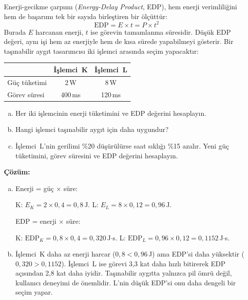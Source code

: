 \begin{ornek}[2.14]
\label{orn:edp}
Enerji-gecikme çarpımı (\emph{Energy-Delay Product}, EDP), hem enerji verimliliğini hem de başarımı tek bir sayıda birleştiren bir ölçüttür:
\[
\text{EDP} = E \times t = P \times t^2
\]
Burada $E$ harcanan enerji, $t$ ise görevin tamamlanma süresidir. Düşük EDP değeri, aynı işi hem az enerjiyle hem de kısa sürede yapabilmeyi gösterir. Bir taşınabilir aygıt tasarımcısı iki işlemci arasında seçim yapacaktır:

\begin{center}
\small
\begin{tabular}{lcc}
\toprule
& \textbf{İşlemci~K} & \textbf{İşlemci~L} \\
\midrule
Güç tüketimi & 2\,W & 8\,W \\
Görev süresi & 400\,ms & 120\,ms \\
\bottomrule
\end{tabular}
\end{center}

\begin{enumerate}[(a)]
    \item Her iki işlemcinin enerji tüketimini ve EDP değerini hesaplayın.
    \item Hangi işlemci taşınabilir aygıt için daha uygundur?
    \item İşlemci~L'nin gerilimi \%20 düşürülürse saat sıklığı \%15 azalır. Yeni güç tüketimini, görev süresini ve EDP değerini hesaplayın.
\end{enumerate}

\textbf{Çözüm:}

\begin{enumerate}[(a)]
    \item Enerji = güç $\times$ süre:

    K: $E_K = 2 \times 0{,}4 = 0{,}8$\,J. \quad L: $E_L = 8 \times 0{,}12 = 0{,}96$\,J.

    EDP = enerji $\times$ süre:

    K: $\text{EDP}_K = 0{,}8 \times 0{,}4 = 0{,}320$\,J$\cdot$s. \quad L: $\text{EDP}_L = 0{,}96 \times 0{,}12 = 0{,}1152$\,J$\cdot$s.

    \item İşlemci~K daha az enerji harcar ($0{,}8 < 0{,}96$\,J) ama EDP'si daha yüksektir ($0{,}320 > 0{,}1152$). İşlemci~L ise görevi 3,3 kat daha hızlı bitirerek EDP açısından 2,8 kat daha iyidir. Taşınabilir aygıtta yalnızca pil ömrü değil, kullanıcı deneyimi de önemlidir. L'nin düşük EDP'si onu daha dengeli bir seçim yapar.


\end{enumerate}
\end{ornek}
